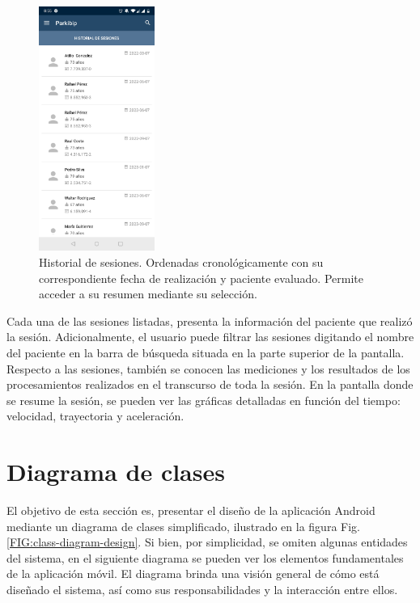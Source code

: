 \newpage

\begin{figure}[H]
 \centering
 \includegraphics[height=8cm]{TESIS/imagenes/chap05/session-list.jpg}
 \caption{Historial de sesiones. Ordenadas cronológicamente con su correspondiente fecha de realización y paciente evaluado. Permite acceder a su resumen mediante su selección.}
 \label{fig:activity-history-session}
\end{figure}

Cada una de las sesiones listadas, presenta la información del paciente que realizó la sesión. Adicionalmente, el usuario puede filtrar las sesiones digitando el nombre del paciente en la barra de búsqueda situada en la parte superior de la pantalla. Respecto a las sesiones, también se conocen las mediciones y los resultados de los procesamientos realizados en el transcurso de toda la sesión. En la pantalla donde se resume la sesión, se pueden ver las gráficas detalladas en función del tiempo: velocidad, trayectoria y aceleración.


\section{Diagrama de clases}

El objetivo de esta sección es, presentar el diseño de la aplicación Android mediante un diagrama de clases simplificado, ilustrado en la figura Fig. \ref{FIG:class-diagram-design}. Si bien, por simplicidad, se omiten algunas entidades del sistema, en el siguiente diagrama se pueden ver los elementos fundamentales de la aplicación móvil. El diagrama brinda una visión general de cómo está diseñado el sistema, así como sus responsabilidades y la interacción entre ellos.

\newpage

